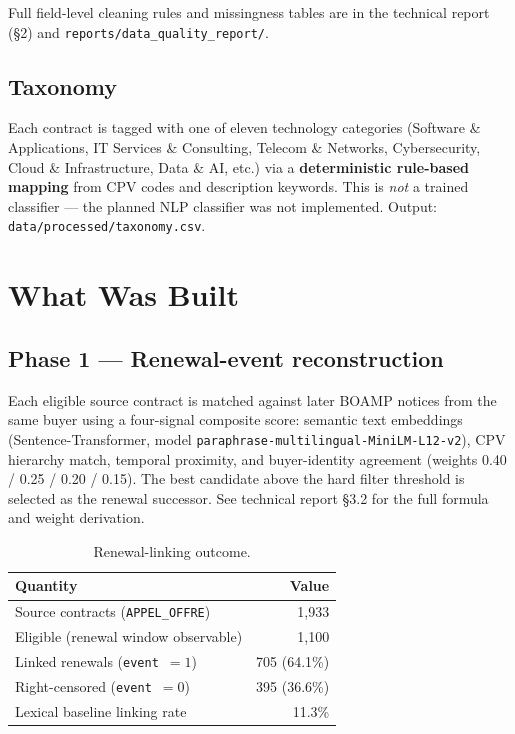 \documentclass[11pt,a4paper]{article}
\begin{document}
Full field-level cleaning rules and missingness tables are in the technical
report (\S2) and \nolinkurl{reports/data_quality_report/}.

\subsection{Taxonomy}
Each contract is tagged with one of eleven technology categories
(Software \& Applications, IT Services \& Consulting, Telecom \& Networks,
Cybersecurity, Cloud \& Infrastructure, Data \& AI, etc.) via a
\textbf{deterministic rule-based mapping} from CPV codes and description keywords.
This is \emph{not} a trained classifier --- the planned NLP classifier was not
implemented. Output: \nolinkurl{data/processed/taxonomy.csv}.

\section{What Was Built}

\subsection{Phase 1 --- Renewal-event reconstruction}
\label{sec:linking}

Each eligible source contract is matched against later BOAMP notices from the
same buyer using a four-signal composite score: semantic text embeddings
(Sentence-Transformer, model \nolinkurl{paraphrase-multilingual-MiniLM-L12-v2}),
CPV hierarchy match, temporal proximity, and buyer-identity agreement
(weights 0.40 / 0.25 / 0.20 / 0.15). The best candidate above the hard
filter threshold is selected as the renewal successor.
See technical report \S3.2 for the full formula and weight derivation.

\begin{table}[H]
\centering
\caption{Renewal-linking outcome.}
\label{tab:link}
\small
\begin{tabular}{@{}lr@{}}
\toprule
\textbf{Quantity} & \textbf{Value} \\
\midrule
Source contracts (\texttt{APPEL\_OFFRE}) & 1,933 \\
Eligible (renewal window observable) & 1,100 \\
Linked renewals (\texttt{event}~$=1$) & 705 \quad(64.1\%) \\
Right-censored (\texttt{event}~$=0$) & 395 \quad(36.6\%) \\
Lexical baseline linking rate & 11.3\% \\
\bottomrule
\end{tabular}
\end{table}
\end{document}
